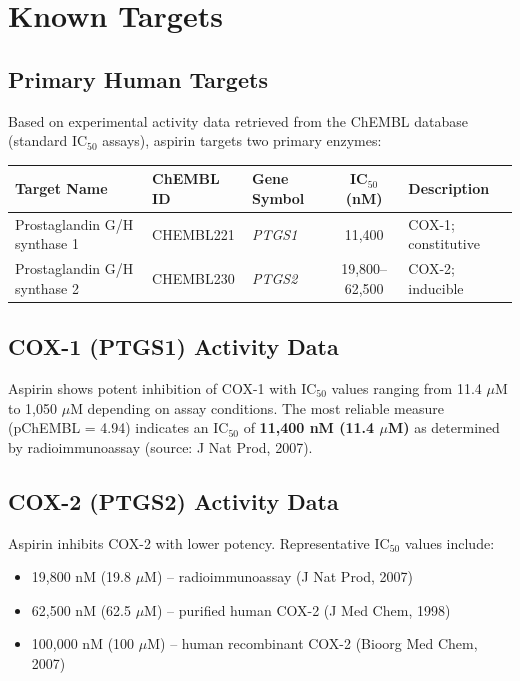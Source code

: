 \documentclass[11pt, a4paper]{article}
\begin{document}
\section{Known Targets}
\subsection{Primary Human Targets}
Based on experimental activity data retrieved from the ChEMBL database (standard IC$_{50}$ assays), aspirin targets two primary enzymes:

\begin{table}[h!]
\centering
\begin{tabular}{lp{3cm}p{3cm}cp{3cm}}
\toprule
\textbf{Target Name} & \textbf{ChEMBL ID} & \textbf{Gene Symbol} & \textbf{IC$_{50}$ (nM)} & \textbf{Description} \\
\midrule
Prostaglandin G/H synthase 1 & CHEMBL221 & \textit{PTGS1} & 11,400 & COX-1; constitutive \\
Prostaglandin G/H synthase 2 & CHEMBL230 & \textit{PTGS2} & 19,800--62,500 & COX-2; inducible \\
\bottomrule
\end{tabular}
\end{table}

\subsection{COX-1 (PTGS1) Activity Data}
Aspirin shows potent inhibition of COX-1 with IC$_{50}$ values ranging from 11.4 $\mu$M to 1,050 $\mu$M depending on assay conditions. The most reliable measure (pChEMBL = 4.94) indicates an IC$_{50}$ of \textbf{11,400 nM (11.4 $\mu$M)} as determined by radioimmunoassay (source: J Nat Prod, 2007).

\subsection{COX-2 (PTGS2) Activity Data}
Aspirin inhibits COX-2 with lower potency. Representative IC$_{50}$ values include:
\begin{itemize}
    \item 19,800 nM (19.8 $\mu$M) -- radioimmunoassay (J Nat Prod, 2007)
    \item 62,500 nM (62.5 $\mu$M) -- purified human COX-2 (J Med Chem, 1998)
    \item 100,000 nM (100 $\mu$M) -- human recombinant COX-2 (Bioorg Med Chem, 2007)
\end{itemize}
\end{document}
